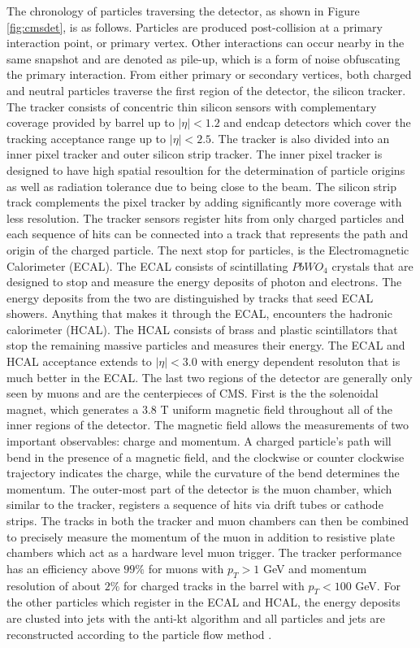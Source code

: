 The chronology of particles traversing the detector, as shown in Figure \ref{fig:cmsdet}, is as follows. Particles are produced post-collision at a primary interaction point, or primary vertex. Other interactions can occur nearby in the same snapshot and are denoted as pile-up, which is a form of noise obfuscating the primary interaction. From either primary or secondary vertices, both charged and neutral particles traverse the first region of the detector, the silicon tracker. The tracker consists of concentric thin silicon sensors with complementary coverage provided by barrel up to $|\eta|<1.2$ and endcap detectors which cover the tracking acceptance range up to $|\eta| < 2.5$. The tracker is also divided into an inner pixel tracker and outer silicon strip tracker. The inner pixel tracker is designed to have high spatial resoultion for the determination of particle origins as well as radiation tolerance due to being close to the beam. The silicon strip track complements the pixel tracker by adding significantly more coverage with less resolution. The tracker sensors  register hits from only charged particles and each sequence of hits can be connected into a track that represents the path and origin of the charged particle.  The next stop for particles, is the Electromagnetic Calorimeter (ECAL). The ECAL consists of scintillating $PbWO_4$ crystals that are designed to stop and measure the energy deposits of photon and electrons. The energy deposits from the two  are distinguished by tracks that seed ECAL showers. Anything that makes it through the ECAL, encounters the hadronic calorimeter (HCAL). The HCAL consists of brass and plastic scintillators that stop the remaining massive particles and measures their energy. The ECAL and HCAL acceptance extends to $|\eta| <3.0$ with energy dependent resoluton that is much better in the ECAL. The last two regions of the detector are generally only seen by muons and are the centerpieces of CMS. First is the the solenoidal magnet, which generates a 3.8 T uniform magnetic field throughout all of the inner regions of the detector. The magnetic field allows the measurements of two important observables: charge and momentum.  A charged particle's path will bend in the presence of a magnetic field, and the clockwise or counter clockwise trajectory indicates the charge, while the curvature of the bend determines the momentum. The outer-most part of the detector is the muon chamber, which similar to the tracker, registers a sequence of hits via drift tubes or cathode strips. The tracks in both the tracker and muon chambers can then be combined to precisely measure the momentum of the muon in addition to resistive plate chambers which act as a hardware level muon trigger. The tracker performance has an efficiency above $99\%$ for muons with $p_T > 1$ GeV and momentum resolution of about $2\%$ for charged tracks in the barrel with $p_T < 100$ GeV. For the other particles which register in the ECAL and HCAL, the energy deposits are clusted into jets with the anti-kt algorithm \cite{Cacciari:2008gp} and all particles and jets are reconstructed according to the particle flow method \cite{CMS:2017yfk}. \cite{CMS:2008xjf} \cite{CMS:2017lum}


